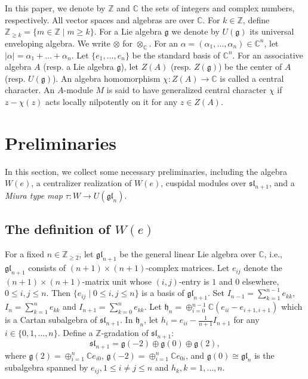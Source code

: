 \documentclass[12pt,a4paper]{amsart}
\numberwithin{equation}{section}
\newcommand{\C}{\mathbb C}
\newcommand{\Z}{\mathbb{Z}}
\def\mg{\mathfrak{g}}
\def\mh{\mathfrak{h}}
\def\sl{\mathfrak{sl}}
\def\gl{\mathfrak{gl}}
\begin{document}
In this paper, we denote by $\Z$ and $\C$ the sets of integers and complex numbers, respectively. All vector spaces and algebras are over $\C$. For  $k\in \Z$,  define $\Z_{\geq k}=\{m\in \Z\mid m\geq k\}$.
For a Lie algebra $\mathfrak{g}$ we denote by $U(\mathfrak{g})$ its universal enveloping algebra.
 We write $\otimes$ for
$\otimes_{\mathbb{C}}$. For an $\alpha=(\alpha_1,\dots,\alpha_n)\in \C^n$, let $|\alpha|=\alpha_1+\dots+\alpha_n$. Let $\{e_1,\dots, e_n\}$ be the standard basis of $\mathbb{C}^n$. For an associative algebra $A$ (resp. a Lie algebra $\mg$), let $Z(A)$ (resp. $Z(\mg)$) be the center of $A$ (resp. $U(\mg)$). An algebra homomorphism  $\chi: Z(A)\rightarrow \C$ is called a central character. An  $A$-module $M$
 is said to have  generalized central character $\chi$ if $z-\chi(z)$ acts locally
 nilpotently on it for any $z\in Z(A)$.

\section{Preliminaries}\label{Sec.2}

In this section, we collect some necessary preliminaries, including
the algebra $W(e)$, a centralizer realization of $W(e)$,
cuspidal modules over $\sl_{n+1}$, and a {\it Miura type map} $\tau: W\rightarrow U(\gl_n)$.

\subsection{The definition of  $W(e)$}

For a fixed  $n\in \Z_{\geq 2}$, let $\gl_{n+1}$ be the general linear Lie algebra over $\C$,  i.e., $\gl_{n+1}$ consists of $(n+1)\times (n+1)$-complex matrices.
 Let $e_{ij}$   denote the $(n+1)\times (n+1)$-matrix  unit whose $(i,j)$-entry is $1$ and $0$ elsewhere, $0\leq i,j \leq n$. Then $\{e_{ij}\mid 0\leq i,j \leq n\}$ is a basis of $\gl_{n+1}$. Set $I_{n-1}=\sum_{k=1}^{n-1}e_{kk}$, $I_{n}=\sum_{k=1}^{n}e_{kk}$ and $I_{n+1}=\sum_{k=0}^{n}e_{kk}$.
Let $\mh_n=\oplus_{i=0}^{n-1}\C (e_{ii}-e_{i+1,i+1})$ which is a Cartan subalgebra of $\sl_{n+1}$.  In  $\mh_n$, let $h_i=e_{ii}-\frac{1}{n+1} I_{n+1}$  for any $i\in \{0, 1,\dots,n\}$.
 Define a $\Z$-gradation of $\sl_{n+1}$:
  $$\sl_{n+1}=\mg(-2)\oplus\mg(0)\oplus \mg(2),$$ where $\mg(2)=\oplus_{i=1}^n \C e_{i0}$, $\mg(-2)=\oplus_{i=1}^n \C e_{0i}$, and $\mg(0)\cong \gl_n$ is the subalgebra spanned by $e_{ij}, 1\leq i \neq j\leq n$ and $h_k, k=1,\dots,n$.
\end{document}
